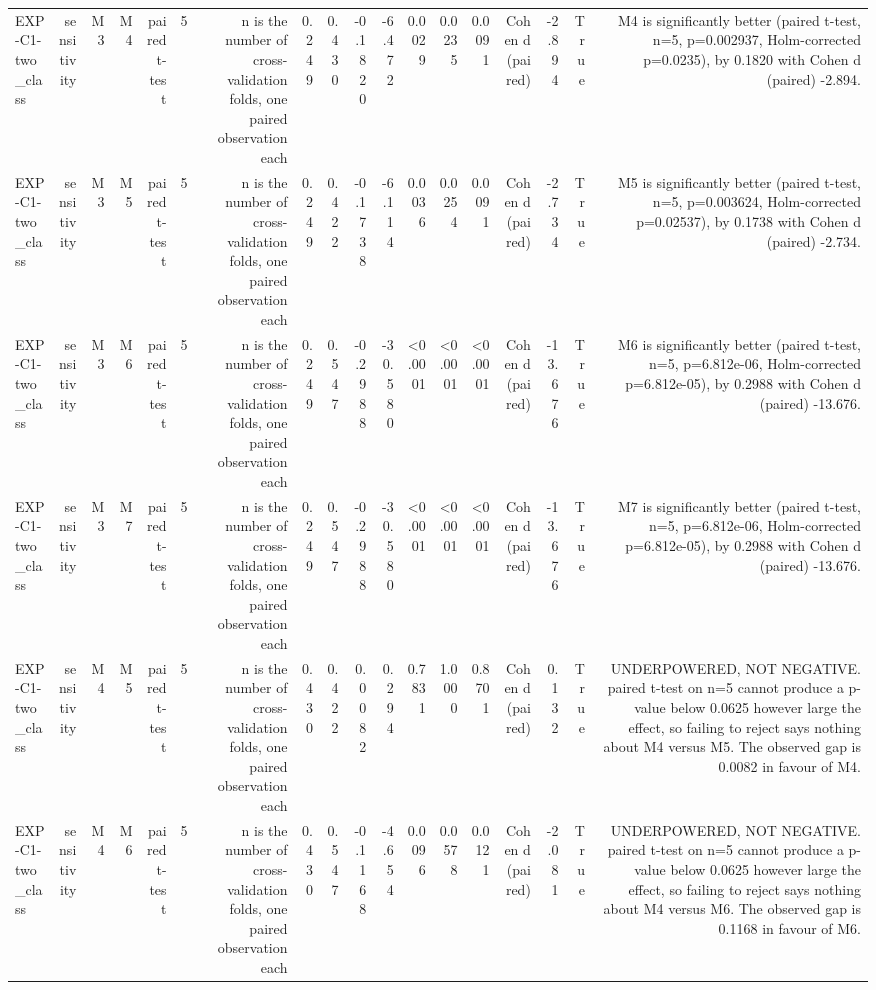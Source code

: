 \begin{table}[htbp]
\begin{tabular}{lrrrrrrrrrrrrrrrrr}
    EXP-C1-two\_class & sensitivity & M3 & M4 & paired t-test & 5 & n is the number of cross-validation folds, one paired observation each & 0.249 & 0.430 & -0.1820 & -6.472 & 0.0029 & 0.0235 & 0.0091 & Cohen d (paired) & -2.894 & True & M4 is significantly better (paired t-test, n=5, p=0.002937, Holm-corrected p=0.0235), by 0.1820 with Cohen d (paired) -2.894. \\
    EXP-C1-two\_class & sensitivity & M3 & M5 & paired t-test & 5 & n is the number of cross-validation folds, one paired observation each & 0.249 & 0.422 & -0.1738 & -6.114 & 0.0036 & 0.0254 & 0.0091 & Cohen d (paired) & -2.734 & True & M5 is significantly better (paired t-test, n=5, p=0.003624, Holm-corrected p=0.02537), by 0.1738 with Cohen d (paired) -2.734. \\
    EXP-C1-two\_class & sensitivity & M3 & M6 & paired t-test & 5 & n is the number of cross-validation folds, one paired observation each & 0.249 & 0.547 & -0.2988 & -30.580 & <0.0001 & <0.0001 & <0.0001 & Cohen d (paired) & -13.676 & True & M6 is significantly better (paired t-test, n=5, p=6.812e-06, Holm-corrected p=6.812e-05), by 0.2988 with Cohen d (paired) -13.676. \\
    EXP-C1-two\_class & sensitivity & M3 & M7 & paired t-test & 5 & n is the number of cross-validation folds, one paired observation each & 0.249 & 0.547 & -0.2988 & -30.580 & <0.0001 & <0.0001 & <0.0001 & Cohen d (paired) & -13.676 & True & M7 is significantly better (paired t-test, n=5, p=6.812e-06, Holm-corrected p=6.812e-05), by 0.2988 with Cohen d (paired) -13.676. \\
    EXP-C1-two\_class & sensitivity & M4 & M5 & paired t-test & 5 & n is the number of cross-validation folds, one paired observation each & 0.430 & 0.422 & 0.0082 & 0.294 & 0.7831 & 1.0000 & 0.8701 & Cohen d (paired) & 0.132 & True & UNDERPOWERED, NOT NEGATIVE. paired t-test on n=5 cannot produce a p-value below 0.0625 however large the effect, so failing to reject says nothing about M4 versus M5. The observed gap is 0.0082 in favour of M4. \\
    EXP-C1-two\_class & sensitivity & M4 & M6 & paired t-test & 5 & n is the number of cross-validation folds, one paired observation each & 0.430 & 0.547 & -0.1168 & -4.654 & 0.0096 & 0.0578 & 0.0121 & Cohen d (paired) & -2.081 & True & UNDERPOWERED, NOT NEGATIVE. paired t-test on n=5 cannot produce a p-value below 0.0625 however large the effect, so failing to reject says nothing about M4 versus M6. The observed gap is 0.1168 in favour of M6. \\

\end{tabular}
\end{table}
